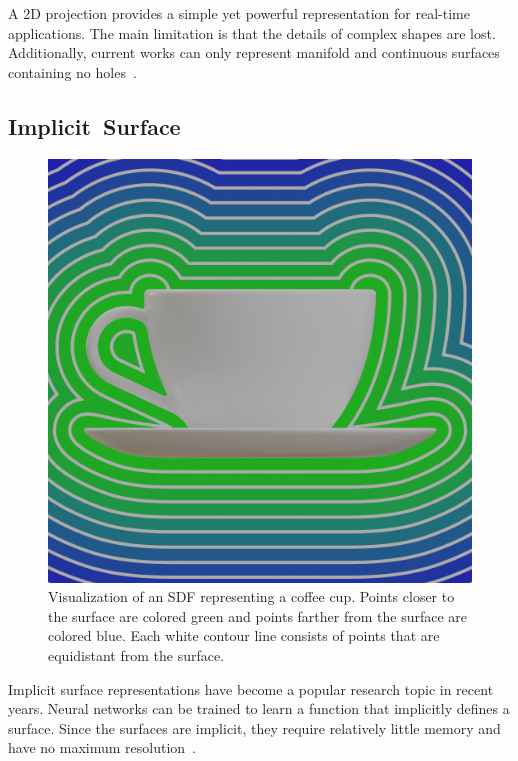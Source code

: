 A 2D projection provides a simple yet powerful representation for real-time applications. The main limitation is that the details of complex shapes are lost. Additionally, current works can only represent manifold and continuous surfaces containing no holes~\cite{Sinha2017}.

\newpage


\subsection{Implicit~Surface}
\label{subsec:implicit_surface}

\begin{figure}[ht]
	\centering
	\includegraphics[scale=0.2]{Images/SDF Cup}
	\caption{Visualization of an SDF representing a coffee cup. Points closer to the surface are colored green and points farther from the surface are colored blue. Each white contour line consists of points that are equidistant from the surface.}
	\label{fig:sdf_cup}
\end{figure}

Implicit surface representations have become a popular research topic in recent years. Neural networks can be trained to learn a function that implicitly defines a surface. Since the surfaces are implicit, they require relatively little memory and have no maximum resolution~\cite{Xiao2020}.

